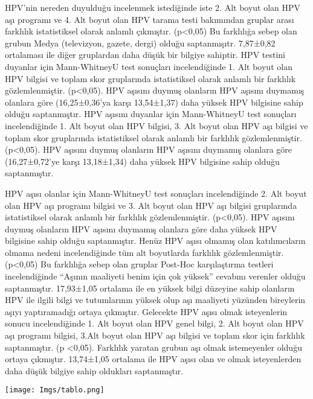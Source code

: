 \documentclass[turkish]{article}
\begin{document}
HPV’nin nereden duyulduğu incelenmek istediğinde iste 2. Alt boyut olan HPV aşı programı ve 4. Alt boyut olan HPV tarama testi bakımından gruplar arası farklılık istatistiksel olarak anlamlı çıkmıştır. (p<0,05) Bu farklılığa sebep olan grubun Medya (televizyon, gazete, dergi) olduğu saptanmışıtr. 7,87±0,82 ortalaması ile diğer gruplardan daha düşük bir bilgiye sahiptir.
HPV testini duyanlar için Mann-WhitneyU test sonuçları incelendiğinde 1. Alt boyut olan HPV bilgisi ve toplam skor gruplarında istatistiksel olarak anlamlı bir farklılık gözlemlenmiştir. (p<0,05). HPV aşısını duymuş olanların HPV aşısını duymamış olanlara göre (16,25±0,36'ya karşı 13,54±1,37) daha yüksek HPV bilgisine sahip olduğu saptanmıştır.
HPV aşısını duyanlar için Mann-WhitneyU test sonuçları incelendiğinde 1. Alt boyut olan HPV bilgisi, 3. Alt boyut olan HPV aşı bilgisi ve toplam skor gruplarında istatistiksel olarak anlamlı bir farklılık gözlemlenmiştir. (p<0,05). HPV aşısını duymuş olanların HPV aşısını duymamış olanlara göre (16,27±0,72'ye karşı 13,18±1,34) daha yüksek HPV bilgisine sahip olduğu saptanmıştır.

HPV aşısı olanlar için Mann-WhitneyU test sonuçları incelendiğinde 2. Alt boyut olan HPV aşı programı bilgisi ve 3. Alt boyut olan HPV aşı bilgisi gruplarında istatistiksel olarak anlamlı bir farklılık gözlemlenmiştir. (p<0,05). HPV aşısını duymuş olanların HPV aşısını duymamış olanlara göre daha yüksek HPV bilgisine sahip olduğu saptanmıştır.
Henüz HPV aşısı olmamış olan katılımcıların olmama nedeni incelendiğinde tüm alt boyutlarda farklılık gözlemlenmiştir. (p<0,05) Bu farklılığa sebep olan gruplar Post-Hoc karşılaştırma testleri incelendiğinde “Aşının maaliyeti benim için çok yüksek” cevabını verenler olduğu saptanmıştır. 17,93±1,05 ortalama ile en yüksek bilgi düzeyine sahip olanların HPV ile ilgili bilgi ve tutumlarının yüksek olup aşı maaliyeti yüzünden bireylerin aşıyı yaptıramadığı ortaya çıkmıştır.
Gelecekte HPV aşısı olmak isteyenlerin sonucu incelendiğinde 1. Alt boyut olan HPV genel bilgi, 2. Alt boyut olan HPV aşı programı bilgisi, 3.Alt boyut olan HPV aşı bilgisi ve toplam skor için farklılık saptanmıştır. (p <0,05). Farklılık yaratan grubun aşı olmak istemeyenler olduğu ortaya çıkmıştır. 13,74±1,05 ortalama ile HPV aşısı olan ve olmak isteyenlerden daha düşük bilgiye sahip oldukları saptanmıştır.


\newpage
\begin{center}
    
    \centering
    \texttt{[image: Imgs/tablo.png]}
    \caption{}
    \label{}
\end{center}
\end{document}
